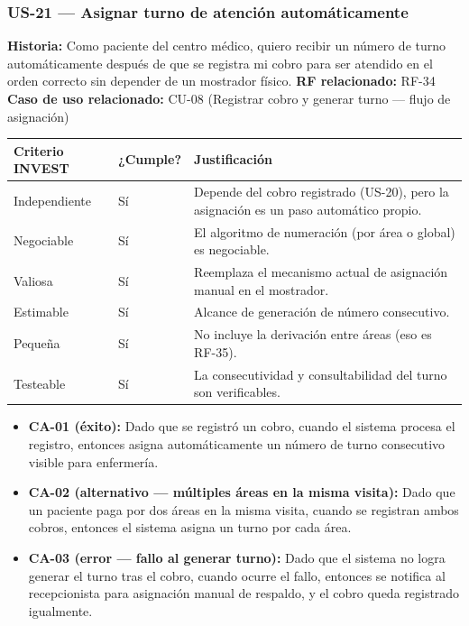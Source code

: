 \documentclass[11pt,a4paper]{article}
\providecommand{\tightlist}{%
	\setlength{\itemsep}{0pt}\setlength{\parskip}{0pt}}
\begin{document}
	\subsubsection{US-21 --- Asignar turno de atención automáticamente}
	
	\textbf{Historia:} Como paciente del centro médico, quiero recibir un número de turno automáticamente después de que se registra mi cobro para ser atendido en el orden correcto sin depender de un mostrador físico.
	\textbf{RF relacionado:} RF-34
	\textbf{Caso de uso relacionado:} CU-08 (Registrar cobro y generar turno --- flujo de asignación)
	
	\begin{longtable}{p{} p{} p{}}
		
		
		\toprule
		\textbf{Criterio INVEST} &
		\textbf{¿Cumple?} &
		\textbf{Justificación} \\
		\midrule
		\endhead
		
		Independiente & Sí & Depende del cobro registrado (US-20), pero la asignación es un paso automático propio. \\
		Negociable & Sí & El algoritmo de numeración (por área o global) es negociable. \\
		Valiosa & Sí & Reemplaza el mecanismo actual de asignación manual en el mostrador. \\
		Estimable & Sí & Alcance de generación de número consecutivo. \\
		Pequeña & Sí & No incluye la derivación entre áreas (eso es RF-35). \\
		Testeable & Sí & La consecutividad y consultabilidad del turno son verificables. \\
		
		\bottomrule
	\end{longtable}
	
	\begin{itemize}
		\tightlist
		\item
		\textbf{CA-01 (éxito):} Dado que se registró un cobro, cuando el sistema procesa el registro, entonces asigna automáticamente un número de turno consecutivo visible para enfermería.
		\item
		\textbf{CA-02 (alternativo --- múltiples áreas en la misma visita):} Dado que un paciente paga por dos áreas en la misma visita, cuando se registran ambos cobros, entonces el sistema asigna un turno por cada área.
		\item
		\textbf{CA-03 (error --- fallo al generar turno):} Dado que el sistema no logra generar el turno tras el cobro, cuando ocurre el fallo, entonces se notifica al recepcionista para asignación manual de respaldo, y el cobro queda registrado igualmente.
	\end{itemize}
	
\end{document}

